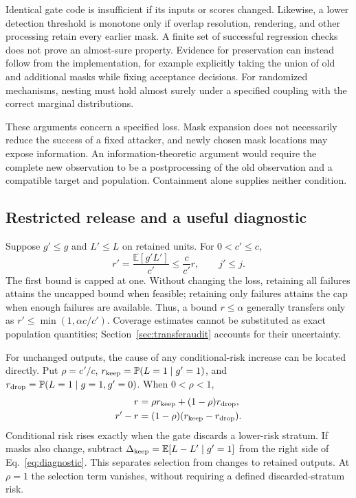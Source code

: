 \documentclass[conference]{IEEEtran}
\newcommand{\Prb}{\mathbb{P}}
\newcommand{\E}{\mathbb{E}}
\begin{document}
Identical gate code is insufficient if its inputs or scores changed. Likewise, a lower detection threshold is monotone only if overlap resolution, rendering, and other processing retain every earlier mask. A finite set of successful regression checks does not prove an almost-sure property. Evidence for preservation can instead follow from the implementation, for example explicitly taking the union of old and additional masks while fixing acceptance decisions. For randomized mechanisms, nesting must hold almost surely under a specified coupling with the correct marginal distributions.

These arguments concern a specified loss. Mask expansion does not necessarily reduce the success of a fixed attacker, and newly chosen mask locations may expose information. An information-theoretic argument would require the complete new observation to be a postprocessing of the old observation and a compatible target and population. Containment alone supplies neither condition.

\subsection{Restricted release and a useful diagnostic}
Suppose $g'\leq g$ and $L'\leq L$ on retained units. For $0<c'\leq c$,
\begin{equation}
 r'=\frac{\E[g'L']}{c'}\leq\frac{c}{c'}r,
 \qquad j'\leq j.
 \label{eq:transfer}
\end{equation}
The first bound is capped at one. Without changing the loss, retaining all failures attains the uncapped bound when feasible; retaining only failures attains the cap when enough failures are available. Thus, a bound $r\leq\alpha$ generally transfers only as $r'\leq\min(1,\alpha c/c')$. Coverage estimates cannot be substituted as exact population quantities; Section~\ref{sec:transferaudit} accounts for their uncertainty.

For unchanged outputs, the cause of any conditional-risk increase can be located directly. Put $\rho=c'/c$, $r_{\rm keep}=\Prb(L=1\mid g'=1)$, and $r_{\rm drop}=\Prb(L=1\mid g=1,g'=0)$. When $0<\rho<1$,
\begin{align}
 r&=\rho r_{\rm keep}+(1-\rho)r_{\rm drop},\label{eq:mixture}\\
 r'-r&=(1-\rho)(r_{\rm keep}-r_{\rm drop}).\label{eq:diagnostic}
\end{align}
Conditional risk rises exactly when the gate discards a lower-risk stratum. If masks also change, subtract $\Delta_{\rm keep}=\E[L-L'\mid g'=1]$ from the right side of Eq.~\eqref{eq:diagnostic}. This separates selection from changes to retained outputs. At $\rho=1$ the selection term vanishes, without requiring a defined discarded-stratum risk.
\end{document}
